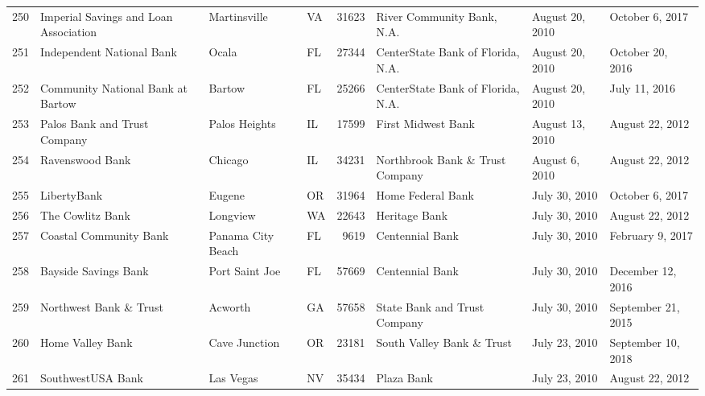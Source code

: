 \begin{tabular}{llllrlll}
250 &              Imperial Savings and Loan Association &        Martinsville &  VA &  31623 &                         River Community Bank, N.A. &     August 20, 2010 &     October 6, 2017 \\
251 &                          Independent National Bank &               Ocala &  FL &  27344 &                  CenterState Bank of Florida, N.A. &     August 20, 2010 &    October 20, 2016 \\
252 &                  Community National Bank at Bartow &              Bartow &  FL &  25266 &                  CenterState Bank of Florida, N.A. &     August 20, 2010 &       July 11, 2016 \\
253 &                       Palos Bank and Trust Company &       Palos Heights &  IL &  17599 &                                 First Midwest Bank &     August 13, 2010 &     August 22, 2012 \\
254 &                                    Ravenswood Bank &             Chicago &  IL &  34231 &                    Northbrook Bank \& Trust Company &      August 6, 2010 &     August 22, 2012 \\
255 &                                        LibertyBank &              Eugene &  OR &  31964 &                                  Home Federal Bank &       July 30, 2010 &     October 6, 2017 \\
256 &                                   The Cowlitz Bank &            Longview &  WA &  22643 &                                      Heritage Bank &       July 30, 2010 &     August 22, 2012 \\
257 &                             Coastal Community Bank &   Panama City Beach &  FL &   9619 &                                    Centennial Bank &       July 30, 2010 &    February 9, 2017 \\
258 &                               Bayside Savings Bank &      Port Saint Joe &  FL &  57669 &                                    Centennial Bank &       July 30, 2010 &   December 12, 2016 \\
259 &                             Northwest Bank \& Trust &             Acworth &  GA &  57658 &                       State Bank and Trust Company &       July 30, 2010 &  September 21, 2015 \\
260 &                                   Home Valley Bank &       Cave Junction &  OR &  23181 &                          South Valley Bank \& Trust &       July 23, 2010 &  September 10, 2018 \\
261 &                                  SouthwestUSA Bank &           Las Vegas &  NV &  35434 &                                         Plaza Bank &       July 23, 2010 &     August 22, 2012 \\

\end{tabular}
